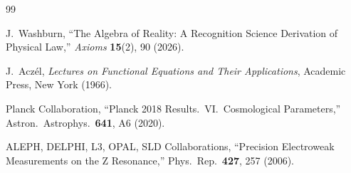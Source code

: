 \documentclass[12pt,a4paper]{article}
\theoremstyle{definition}
\theoremstyle{remark}
\begin{document}
\begin{thebibliography}{99}

J.~Washburn, ``The Algebra of Reality: A Recognition Science Derivation
of Physical Law,'' \emph{Axioms} \textbf{15}(2), 90 (2026).

J.~Acz\'el, \textit{Lectures on Functional Equations and Their Applications},
Academic Press, New York (1966).

Planck Collaboration, ``Planck 2018 Results.\ VI.\ Cosmological
Parameters,'' Astron.\ Astrophys.\ \textbf{641}, A6 (2020).

ALEPH, DELPHI, L3, OPAL, SLD Collaborations, ``Precision
Electroweak Measurements on the Z Resonance,'' Phys.\ Rep.\
\textbf{427}, 257 (2006).

\end{thebibliography}
\end{document}
